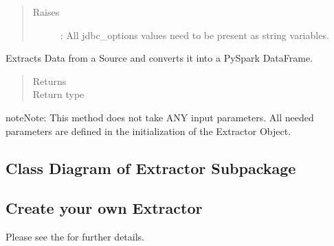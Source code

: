 \documentclass[a4paper,10pt, twoside,english]{sphinxmanual}
\begin{document}
\begin{fulllineitems}
\begin{quote}
\begin{description}
\begin{itemize}
\end{itemize}

\item[{Raises}] \leavevmode
{}: \textendash{} All jdbc\_options values need to be present as string variables.

\end{description}\end{quote}

\begin{fulllineitems}
\label{\detokenize{extractor/jdbc:spooq2.extractor.jdbc.JDBCExtractorIncremental.extract}}
Extracts Data from a Source and converts it into a PySpark DataFrame.
\begin{quote}\begin{description}
\item[{Returns}] \leavevmode


\item[{Return type}] \leavevmode
{}

\end{description}\end{quote}

\begin{sphinxadmonition}{note}{Note:}
This method does not take ANY input parameters. All needed parameters are defined
in the initialization of the Extractor Object.
\end{sphinxadmonition}

\end{fulllineitems}


\end{fulllineitems}



\subsection{Class Diagram of Extractor Subpackage}
\label{\detokenize{extractor/overview:class-diagram-of-extractor-subpackage}}
\noindent{}


\subsection{Create your own Extractor}
\label{\detokenize{extractor/overview:create-your-own-extractor}}
Please see the {\hyperref[\detokenize{base_classes/extractor:custom-extractor}]{}} for further details.
\end{document}
